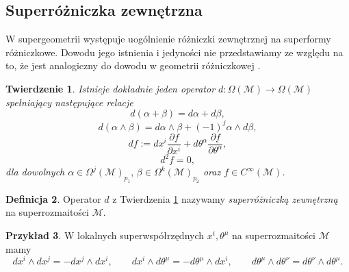 \documentclass[11pt,a4paper]{report}
\newtheorem{theorem}{Twierdzenie}[section]
\theoremstyle{definition}
\newtheorem{example}[theorem]{Przykład}
\newtheorem{definition}[theorem]{Definicja}
\begin{document}
\subsection{Superróżniczka zewnętrzna}
		      			
W supergeometrii występuje uogólnienie różniczki zewnętrznej na superformy różniczkowe. Dowodu jego istnienia i jedyności nie przedstawiamy ze względu na to, że jest analogiczny do dowodu w geometrii różniczkowej \cite{rogers}.
		      			
\begin{theorem}\label{SupRozZew} 
	Istnieje dokładnie jeden operator $d: \Omega (\mathcal{M}) \rightarrow \Omega (\mathcal{M})$ spełniający następujące relacje
	\begin{equation}
		d(\alpha+\beta)=d\alpha+d\beta,
	\end{equation}
	\begin{equation}
		d(\alpha\wedge \beta)=d\alpha\wedge \beta+(-1)^j \alpha\wedge d\beta,
	\end{equation}
	\begin{equation}
		df:=dx^i\frac{\partial f}{\partial x^i}+d\theta^\alpha\frac{\partial f}{\partial \theta^\alpha},
	\end{equation}
	\begin{equation}
		d^2f=0,
	\end{equation}
	dla dowolnych $\alpha \in \Omega^j (\mathcal{M})_{p_1},\, \beta\in \Omega^k (\mathcal{M})_{p_2}$ oraz $f \in C^\infty (\mathcal M)$.
\end{theorem}
		      			
\begin{definition}
	Operator $d$ z Twierdzenia \ref{SupRozZew} nazywamy \textit{superróżniczką zewnętrzną} na superrozmaitości $\mathcal M$.
\end{definition}
		      			
\begin{example}
	W lokalnych superwspółrzędnych $x^i, \theta^\mu$ na superrozmaitości $\mathcal{M}$ mamy
	\begin{equation*}
		dx^i\wedge dx^j=-dx^j\wedge dx^i,\qquad dx^i\wedge d\theta^\mu=-d\theta^\mu \wedge dx^i,\qquad d\theta^\mu \wedge d\theta^\nu =d\theta^\nu \wedge d\theta^\mu.
	\end{equation*}
\end{example}
			      				
\end{document}
